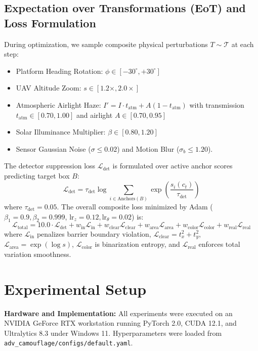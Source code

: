 \documentclass[conference]{IEEEtran}
\begin{document}
\subsection{Expectation over Transformations (EoT) and Loss Formulation}
During optimization, we sample composite physical perturbations $T \sim \mathcal{T}$ at each step:
\begin{itemize}
    \item Platform Heading Rotation: $\phi \in [-30^\circ, +30^\circ]$
    \item UAV Altitude Zoom: $s \in [1.2\times, 2.0\times]$
    \item Atmospheric Airlight Haze: $I' = I \cdot t_{\text{atm}} + A(1 - t_{\text{atm}})$ with transmission $t_{\text{atm}} \in [0.70, 1.00]$ and airlight $A \in [0.70, 0.95]$
    \item Solar Illuminance Multiplier: $\beta \in [0.80, 1.20]$
    \item Sensor Gaussian Noise ($\sigma \le 0.02$) and Motion Blur ($\sigma_b \le 1.20$).
\end{itemize}

The detector suppression loss $\mathcal{L}_{\text{det}}$ is formulated over active anchor scores predicting target box $B$:
\begin{equation}
\mathcal{L}_{\text{det}} = \tau_{\text{det}} \log \sum_{i \in \text{Anchors}(B)} \exp\left(\frac{s_i(c_t)}{\tau_{\text{det}}}\right)
\end{equation}
where $\tau_{\text{det}} = 0.05$. The overall composite loss minimized by Adam ($\beta_1=0.9, \beta_2=0.999$, $\text{lr}_z=0.12, \text{lr}_\theta=0.02$) is:
\begin{equation}
\mathcal{L}_{\text{total}} = 10.0 \cdot \mathcal{L}_{\text{det}} + w_{\text{in}} \mathcal{L}_{\text{in}} + w_{\text{clear}} \mathcal{L}_{\text{clear}} + w_{\text{area}} \mathcal{L}_{\text{area}} + w_{\text{color}} \mathcal{L}_{\text{color}} + w_{\text{real}} \mathcal{L}_{\text{real}}
\end{equation}
where $\mathcal{L}_{\text{in}}$ penalizes barrier boundary violation, $\mathcal{L}_{\text{clear}} = t_x^2 + t_y^2$, $\mathcal{L}_{\text{area}} = \exp(\log s)$, $\mathcal{L}_{\text{color}}$ is binarization entropy, and $\mathcal{L}_{\text{real}}$ enforces total variation smoothness.

\section{Experimental Setup}
\textbf{Hardware and Implementation:} All experiments were executed on an NVIDIA GeForce RTX workstation running PyTorch 2.0, CUDA 12.1, and Ultralytics 8.3 under Windows 11. Hyperparameters were loaded from \texttt{adv\_camouflage/configs/default.yaml}.
\end{document}
